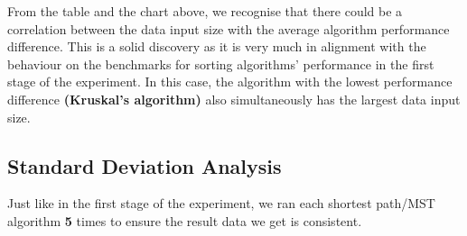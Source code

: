 From the table and the chart above, we recognise that there could be a correlation between the data input size with the average algorithm performance difference. This is a solid discovery as it is very much in alignment with the behaviour on the benchmarks for sorting algorithms' performance in the first stage of the experiment. In this case, the algorithm with the lowest performance difference \textbf{(Kruskal's algorithm)} also simultaneously has the largest data input size.

\subsection{Standard Deviation Analysis}

Just like in the first stage of the experiment, we ran each shortest path/MST algorithm \textbf{5} times to ensure the result data we get is consistent.

